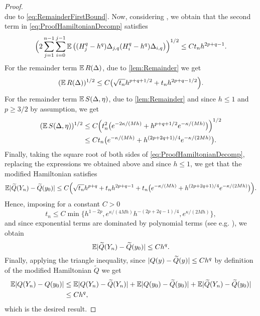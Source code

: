 \documentclass[10pt]{article}
\begin{document}
\begin{proof}
\begin{equation}
	\end{equation}
	due to \eqref{eq:RemainderFirstBound}. Now, considering \corr{\eqref{eq:RemainderFourthBound}}, we obtain that the second term in \eqref{eq:ProofHamiltonianDecomp} satisfies
	\begin{equation}
		\Big(2\sum_{j=1}^{n-1}\sum_{i=0}^{j-1} \operatorname{\mathbb{E}}\big((H_j^q - h^q)\Delta_{j,q}(H_i^q - h^q) \Delta_{i,q}\big)\Big)^{1/2} \leq  C t_n h^{2p+q-1}.
	\end{equation}
	For the remainder term $\operatorname{\mathbb{E}} R(\Delta)$, due to \cref{lem:Remainder} we get
	\begin{equation}
		(\operatorname{\mathbb{E}} R(\Delta))^{1/2} \leq C \big(\sqrt{t_n} h^{p + q + 1/2} + t_n h^{2p + q - 1/2}\Big).
	\end{equation}
	For the remainder term $\operatorname{\mathbb{E}} S(\Delta, \eta)$, due to \cref{lem:Remainder} and since $h \leq 1$ and $p \geq 3/2$ by assumption, we get
	\begin{equation}\label{eq:BoundS}
	\begin{aligned}
		(\operatorname{\mathbb{E}} S(\Delta, \eta))^{1/2} &\leq C \Big( t_n^2 \big(e^{-2\kappa/(Mh)} + h^{p+q+1/2}e^{-\kappa/(Mh)}\big) \Big)^{1/2}\\
		&\leq C t_n \big(e^{-\kappa/(Mh)} + h^{(2p+2q+1)/4}e^{-\kappa/(2Mh)}\big).
	\end{aligned}
	\end{equation}
	Finally, taking the square root of both sides of \eqref{eq:ProofHamiltonianDecomp}, replacing the expressions we obtained above and since $h \leq 1$, we get that the modified Hamiltonian satisfies
	\begin{equation}
	\begin{aligned}
		\operatorname{\mathbb{E}} \lvert\widetilde Q(Y_n) - \widetilde Q(y_0)\rvert \leq C \Big(\sqrt{t_n} h^{p+q} + t_n h^{2p+q-1} + t_n \big(e^{-\kappa/(Mh)} + h^{(2p+2q+1)/4}e^{-\kappa/(2Mh)}\big)\Big).
	\end{aligned}
	\end{equation}
	Hence, imposing for a constant $C > 0$
	\begin{equation}
		t_n \leq C \min\{h^{1-2p}, e^{\kappa/(4Mh)} h^{-(2p+2q-1)/4}, e^{\kappa/(2Mh)}\},
	\end{equation}
	and since exponential terms are dominated by polynomial terms (see e.g. \cite[Theorem IX.8.1]{HLW06}), we obtain
	\begin{equation}\label{eq:HamiltonianTheoremSemiResult}
		\operatorname{\mathbb{E}} \lvert\widetilde Q(Y_n) - \widetilde Q(y_0)\rvert \leq Ch^q.
	\end{equation}
	Finally, applying the triangle inequality, since  $\lvert Q(y) - \widetilde Q(y)\rvert \leq Ch^q$ by definition of the modified Hamiltonian $\tilde Q$  we get
	\begin{equation}
	\begin{aligned}
		\operatorname{\mathbb{E}}\lvert Q(Y_n) - Q(y_0)\rvert &\leq \operatorname{\mathbb{E}}\lvert Q(Y_n) - \widetilde Q(Y_n)\rvert + \operatorname{\mathbb{E}} \lvert Q(y_0) - \widetilde Q (y_0)\rvert + \operatorname{\mathbb{E}}\lvert\widetilde Q(Y_n) - \widetilde Q(y_0)\rvert \\
		&\leq C h^q,
	\end{aligned}
	\end{equation}
	which is the desired result.
\end{proof}
\end{document}
